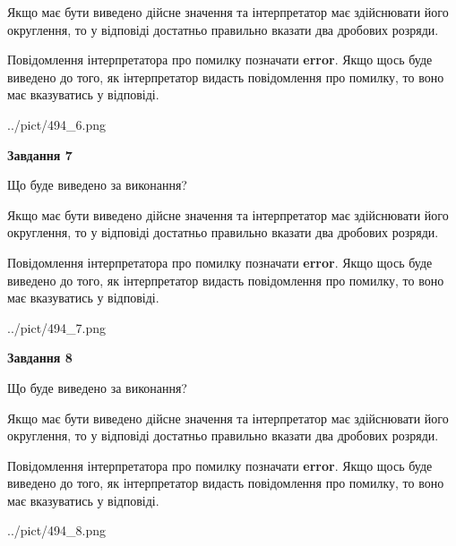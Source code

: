\documentclass[12pt, ukrainian]{article}
\begin{document}
{\begin {Large}
Якщо має бути виведено дійсне значення та інтерпретатор має здійснювати його округлення, 
то у відповіді достатньо правильно вказати два дробових розряди.

Повідомлення інтерпретатора про помилку позначати \textbf{error}.
Якщо щось буде виведено до того, як інтерпретатор видасть повідомлення про помилку, 
то воно має вказуватись у відповіді. \par

\begin{center}
	{../pict/494_6.png}
\end{center}
\newpage

{\begin {center}\textbf{Завдання 7}\end {center}}\par
Що буде виведено за виконання? \par

Якщо має бути виведено дійсне значення та інтерпретатор має здійснювати його округлення, 
то у відповіді достатньо правильно вказати два дробових розряди.

Повідомлення інтерпретатора про помилку позначати \textbf{error}.
Якщо щось буде виведено до того, як інтерпретатор видасть повідомлення про помилку, 
то воно має вказуватись у відповіді. \par

\begin{center}
	{../pict/494_7.png}
\end{center}
\newpage

{\begin {center}\textbf{Завдання 8}\end {center}}\par
Що буде виведено за виконання? \par

Якщо має бути виведено дійсне значення та інтерпретатор має здійснювати його округлення, 
то у відповіді достатньо правильно вказати два дробових розряди.

Повідомлення інтерпретатора про помилку позначати \textbf{error}.
Якщо щось буде виведено до того, як інтерпретатор видасть повідомлення про помилку, 
то воно має вказуватись у відповіді. \par

\begin{center}
	{../pict/494_8.png}
\end{center}
\newpage


\end{Large}}
\end{document}
